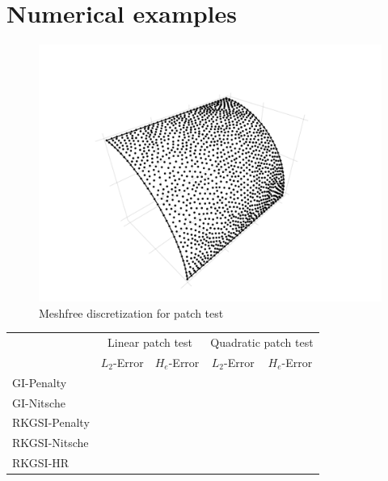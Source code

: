 
\section{Numerical examples}
\begin{figure}[H]
    \centering
    \includegraphics[width=\textwidth]{figures/patchtest_msh}
    \caption{Meshfree discretization for patch test}

\end{figure}

\begin{tabular}{lcccc}
\toprule
 & \multicolumn{2}{c}{Linear patch test} & \multicolumn{2}{c}{Quadratic patch test} \\ \cline{2-5}
 & $L_2$-Error & $H_e$-Error & $L_2$-Error & $H_e$-Error \\
    \midrule
    GI-Penalty & \\
    GI-Nitsche & \\
    RKGSI-Penalty & \\
    RKGSI-Nitsche & \\
    RKGSI-HR & \\
    \bottomrule
\end{tabular}
